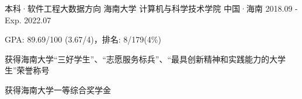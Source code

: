 

\begin{cventries}

  \cventry
    {本科·软件工程大数据方向} %
    {海南大学 计算机与科学技术学院} %
    {中国·海南} %
    {2018.09 - Exp. 2022.07} %
    {
      \begin{cvitems} %
      	\item {GPA: 89.69/100 (3.67/4)，排名: 8/179(4\%)}
        \item {获得海南大学“三好学生”、“志愿服务标兵”、“最具创新精神和实践能力的大学生”荣誉称号}
        \item {获得海南大学一等综合奖学金}
      \end{cvitems}
    }

\end{cventries}
